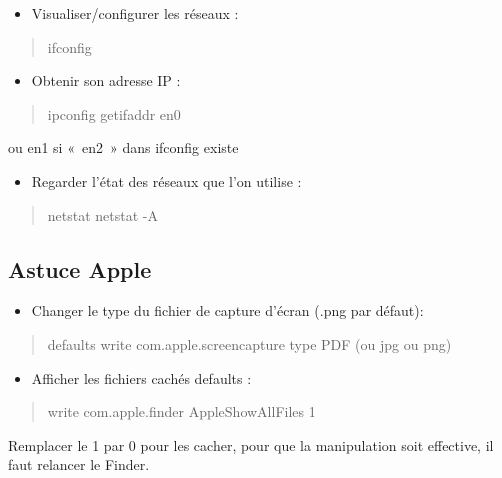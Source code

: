 \begin{itemize}
\tightlist
\item
  Visualiser/configurer les réseaux :
\end{itemize}

\begin{quote}
ifconfig
\end{quote}

\begin{itemize}
\tightlist
\item
  Obtenir son adresse IP :
\end{itemize}

\begin{quote}
ipconfig getifaddr en0
\end{quote}

ou en1 si «~en2~» dans ifconfig existe

\begin{itemize}
\tightlist
\item
  Regarder l'état des réseaux que l'on utilise :
\end{itemize}

\begin{quote}
netstat netstat -A
\end{quote}

\subsection{Astuce Apple}\label{astuce-apple}

\begin{itemize}
\tightlist
\item
  Changer le type du fichier de capture d'écran (.png par défaut):
\end{itemize}

\begin{quote}
defaults write com.apple.screencapture type PDF (ou jpg ou png)
\end{quote}

\begin{itemize}
\tightlist
\item
  Afficher les fichiers cachés defaults :
\end{itemize}

\begin{quote}
write com.apple.finder AppleShowAllFiles 1
\end{quote}

Remplacer le 1 par 0 pour les cacher, pour que la manipulation soit
effective, il faut relancer le Finder.

